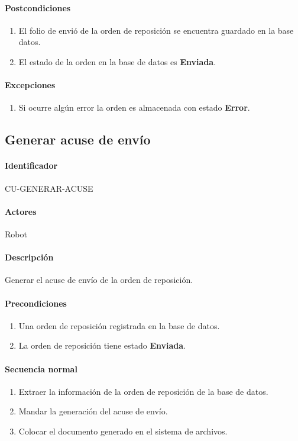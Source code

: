 \paragraph{Postcondiciones}
\begin{enumerate}
  \item El folio de envió de la orden de reposición se encuentra guardado en la base datos.
  \item El estado de la orden en la base de datos es \textbf{Enviada}.
\end{enumerate}
\paragraph{Excepciones}
\begin{enumerate}
  \item Si ocurre algún error la orden es almacenada con estado \textbf{Error}.
\end{enumerate}


\subsection{Generar acuse de envío}
\paragraph{Identificador}
CU-GENERAR-ACUSE
\paragraph{Actores}
Robot
\paragraph{Descripción}
Generar el acuse de envío de la orden de reposición.
\paragraph{Precondiciones}
\begin{enumerate}
  \item Una orden de reposición registrada en la base de datos.
  \item La orden de reposición tiene estado \textbf{Enviada}.
\end{enumerate}
\paragraph{Secuencia normal}
\begin{enumerate}
  \item Extraer la información de la orden de reposición de la base de datos.
  \item Mandar la generación del acuse de envío.
  \item Colocar el documento generado en el sistema de archivos.
\end{enumerate}
